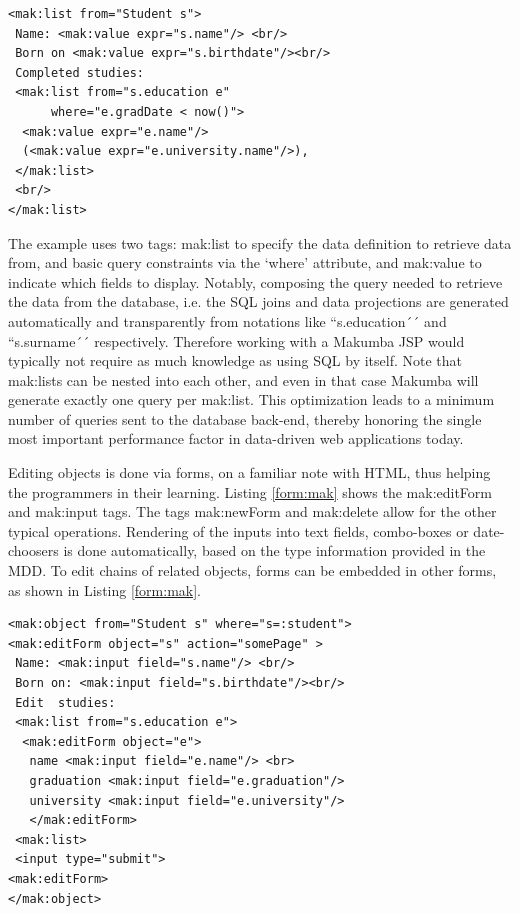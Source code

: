 \documentclass{chi2009}
\begin{document}
\lstset{basicstyle=\small, captionpos=b, caption=Example of viewing data with the Makumba JSP tag library, label=list:mak, frame=shadowbox}
\begin{lstlisting}
<mak:list from="Student s">
 Name: <mak:value expr="s.name"/> <br/>
 Born on <mak:value expr="s.birthdate"/><br/>
 Completed studies:
 <mak:list from="s.education e"
      where="e.gradDate < now()">
  <mak:value expr="e.name"/>
  (<mak:value expr="e.university.name"/>),
 </mak:list>
 <br/>
</mak:list>
\end{lstlisting}

The example uses two tags: mak:list to specify the data definition to retrieve data from, and basic query constraints via the `where' attribute, and mak:value to indicate which fields to display. Notably, composing the query needed to retrieve the data from the database, i.e. the SQL joins and data projections are generated automatically and transparently from notations like ``s.education´´ and ``s.surname´´ respectively. Therefore working with a Makumba JSP would typically not require as much knowledge as using SQL by itself. Note that mak:lists can be nested into each other, and even in that case Makumba will generate exactly one query per mak:list. This optimization leads to a minimum number of queries sent to the database back-end, thereby honoring the single most important performance factor in data-driven web applications today.

Editing objects is done via forms, on a familiar note with HTML, thus helping the programmers in their learning.  Listing  \ref{form:mak} shows the mak:editForm and mak:input tags. The tags mak:newForm and mak:delete allow for the other typical operations. Rendering of the inputs into text fields, combo-boxes or date-choosers is done automatically, based on the type information provided in the MDD. To edit chains of related objects, forms can be embedded in other forms, as shown in Listing \ref{form:mak}.

\lstset{basicstyle=\small, captionpos=b, caption=Example of changing data with the Makumba JSP tag library, label=form:mak, frame=shadowbox}
\begin{lstlisting}
<mak:object from="Student s" where="s=:student">
<mak:editForm object="s" action="somePage" >
 Name: <mak:input field="s.name"/> <br/>
 Born on: <mak:input field="s.birthdate"/><br/>
 Edit  studies:
 <mak:list from="s.education e"> 
  <mak:editForm object="e">
   name <mak:input field="e.name"/> <br>      
   graduation <mak:input field="e.graduation"/>
   university <mak:input field="e.university"/>
   </mak:editForm>
 <mak:list>
 <input type="submit">
<mak:editForm>
</mak:object>
\end{lstlisting}
\end{document}
